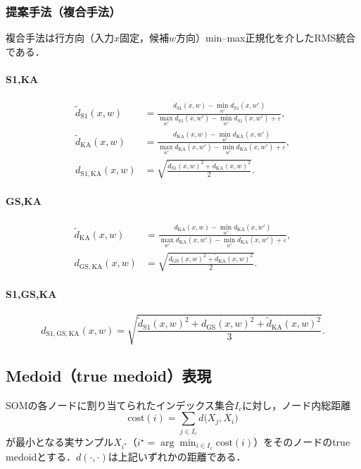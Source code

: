 \documentclass{jarticle}
\theoremstyle{definition}
\begin{document}
\subsubsection*{提案手法（複合手法）}
複合手法は行方向（入力$x$固定，候補$w$方向）min–max正規化を介したRMS統合である．
\paragraph{S1,KA}
\begin{align}
\tilde d_{\mathrm{S1}}(x,w)&=\frac{d_{\mathrm{S1}}(x,w)-\min_{w'}d_{\mathrm{S1}}(x,w')}{\max_{w'}d_{\mathrm{S1}}(x,w')-\min_{w'}d_{\mathrm{S1}}(x,w')+\varepsilon},\\
\tilde d_{\mathrm{KA}}(x,w)&=\frac{d_{\mathrm{KA}}(x,w)-\min_{w'}d_{\mathrm{KA}}(x,w')}{\max_{w'}d_{\mathrm{KA}}(x,w')-\min_{w'}d_{\mathrm{KA}}(x,w')+\varepsilon},\\
d_{\mathrm{S1,KA}}(x,w)&=\sqrt{\frac{\tilde d_{\mathrm{S1}}(x,w)^2+\tilde d_{\mathrm{KA}}(x,w)^2}{2}}.
\end{align}

\paragraph{GS,KA}
\begin{equation}
\begin{aligned}
\tilde d_{\mathrm{KA}}(x,w)
&=\frac{d_{\mathrm{KA}}(x,w)-\min_{w'}d_{\mathrm{KA}}(x,w')}{\max_{w'}d_{\mathrm{KA}}(x,w')-\min_{w'}d_{\mathrm{KA}}(x,w')+\varepsilon},\\
d_{\mathrm{GS,KA}}(x,w)
&=\sqrt{\frac{d_{\mathrm{GS}}(x,w)^2+\tilde d_{\mathrm{KA}}(x,w)^2}{2}}.
\end{aligned}
\end{equation}

\paragraph{S1,GS,KA}
\begin{equation}
d_{\mathrm{S1,GS,KA}}(x,w)=\sqrt{\frac{\tilde d_{\mathrm{S1}}(x,w)^2+d_{\mathrm{GS}}(x,w)^2+\tilde d_{\mathrm{KA}}(x,w)^2}{3}}.
\end{equation}

\subsection{Medoid（true medoid）表現}
SOMの各ノードに割り当てられたインデックス集合$I_c$に対し，ノード内総距離
\begin{equation}
\mathrm{cost}(i)=\sum_{j\in I_c} d\bigl(X_j, X_i\bigr)
\end{equation}
が最小となる実サンプル$X_{i^\star}$（$i^\star=\arg\min_{i\in I_c}\mathrm{cost}(i)$）をそのノードのtrue medoidとする．$d(\cdot,\cdot)$は上記いずれかの距離である．
\end{document}
